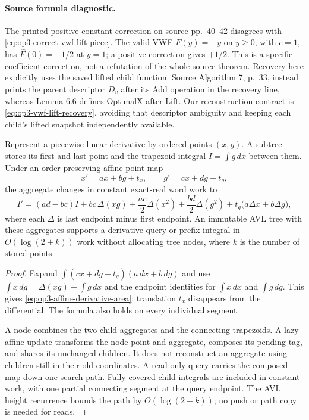 \paragraph{Source formula diagnostic.}
The printed positive constant correction on source pp.\ 40--42 disagrees
with \eqref{eq:op3-correct-vwf-lift-piece}. The valid VWF $F(y)=-y$ on
$y\geq0$, with $c=1$, has $\widehat F(0)=-1/2$ at $y=1$; a positive
correction gives $+1/2$. This is a specific coefficient correction, not
a refutation of the whole source theorem. Recovery here explicitly uses
the saved lifted child function. Source Algorithm 7, p.\ 33, instead
prints the parent descriptor $D_v$ after its Add operation in the recovery
line, whereas Lemma 6.6 defines OptimalX after Lift. Our reconstruction
contract is \eqref{eq:op3-vwf-lift-recovery}, avoiding that descriptor
ambiguity and keeping each child's lifted snapshot independently available.

\begin{lemma}
\label{lem:op3-affine-derivative-integrals}
Represent a piecewise linear derivative by ordered points $(x,g)$.
A subtree stores its first and last point and the trapezoid integral
$I=\int g\,dx$ between them. Under an order-preserving affine point map
\[
 x'=ax+bg+t_x,\qquad g'=cx+dg+t_g,
\]
the aggregate changes in constant exact-real word work to
\begin{equation}
 I'=(ad-bc)I+bc\,\Delta(xg)+\frac{ac}{2}\Delta(x^2)
       +\frac{bd}{2}\Delta(g^2)+t_g\bigl(a\Delta x+b\Delta g\bigr),
 \label{eq:op3-affine-derivative-area}
\end{equation}
where each $\Delta$ is last endpoint minus first endpoint.
An immutable AVL tree with these aggregates supports a derivative query
or prefix integral in $O(\log(2+k))$ work without allocating tree nodes,
where $k$ is the number of stored points.
\end{lemma}
\begin{proof}
Expand $\int(cx+dg+t_g)(a\,dx+b\,dg)$ and use
$\int x\,dg=\Delta(xg)-\int g\,dx$ and the endpoint identities for
$\int x\,dx$ and $\int g\,dg$. This gives
\eqref{eq:op3-affine-derivative-area}; translation $t_x$ disappears from
the differential. The formula also holds on every individual segment.

A node combines the two child aggregates and the connecting trapezoids.
A lazy affine update transforms the node point and aggregate, composes its
pending tag, and shares its unchanged children. It does not reconstruct
an aggregate using children still in their old coordinates. A read-only
query carries the composed map down one search path. Fully covered child
integrals are included in constant work, with one partial connecting
segment at the query endpoint. The AVL height recurrence bounds the path
by $O(\log(2+k))$; no push or path copy is needed for reads.
\end{proof}

